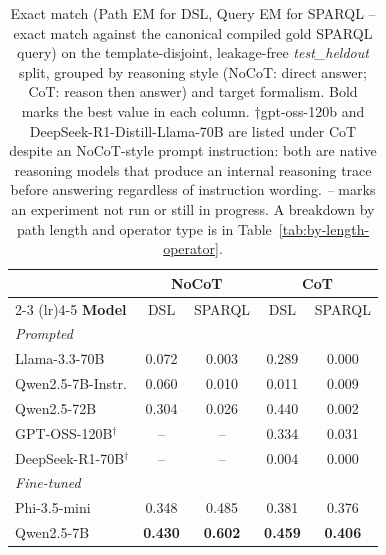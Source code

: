 \begin{table}[t]
\centering
\scriptsize
\setlength{\tabcolsep}{3pt}
\begin{tabular}{l cccc}
\toprule
 & \multicolumn{2}{c}{\textbf{NoCoT}} & \multicolumn{2}{c}{\textbf{CoT}} \\
\cmidrule(lr){2-3} \cmidrule(lr){4-5}
\textbf{Model} & DSL & SPARQL & DSL & SPARQL \\
\midrule
\multicolumn{5}{l}{\textit{Prompted}} \\
Llama-3.3-70B & 0.072 & 0.003 & 0.289 & 0.000 \\
Qwen2.5-7B-Instr. & 0.060 & 0.010 & 0.011 & 0.009 \\
Qwen2.5-72B & 0.304 & 0.026 & 0.440 & 0.002 \\
GPT-OSS-120B$^\dagger$ & -- & -- & 0.334 & 0.031 \\
DeepSeek-R1-70B$^\dagger$ & -- & -- & 0.004 & 0.000 \\
\midrule
\multicolumn{5}{l}{\textit{Fine-tuned}} \\
Phi-3.5-mini & 0.348 & 0.485 & 0.381 & 0.376 \\
Qwen2.5-7B & \textbf{0.430} & \textbf{0.602} & \textbf{0.459} & \textbf{0.406} \\
\bottomrule
\end{tabular}
\caption{Exact match (Path EM for DSL, Query EM for SPARQL -- exact match against the canonical compiled gold SPARQL query) on the template-disjoint, leakage-free \emph{test\_heldout} split, grouped by reasoning style (NoCoT: direct answer; CoT: reason then answer) and target formalism. Bold marks the best value in each column. $\dagger$gpt-oss-120b and DeepSeek-R1-Distill-Llama-70B are listed under CoT despite an NoCoT-style prompt instruction: both are native reasoning models that produce an internal reasoning trace before answering regardless of instruction wording. \emph{--} marks an experiment not run or still in progress. A breakdown by path length and operator type is in Table~\ref{tab:by-length-operator}.}
\label{tab:main-results}
\end{table}

